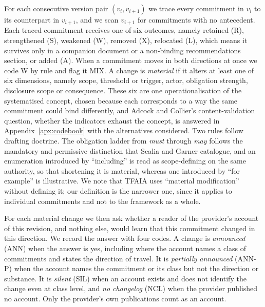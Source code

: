 \documentclass{article}
\begin{document}
For each consecutive version pair $(v_i, v_{i+1})$ we trace every commitment in $v_i$ to its counterpart in $v_{i+1}$, and we scan $v_{i+1}$ for commitments with no antecedent. Each traced commitment receives one of six outcomes, namely retained (R), strengthened (S), weakened (W), removed (X), relocated (L), which means it survives only in a companion document or a non-binding recommendations section, or added (A). When a commitment moves in both directions at once we code W by rule and flag it MIX. A change is \emph{material} if it alters at least one of six dimensions, namely scope, threshold or trigger, actor, obligation strength, disclosure scope or consequence. These six are one operationalisation of the systematised concept, chosen because each corresponds to a way the same commitment could bind differently, and Adcock and Collier's content-validation question, whether the indicators exhaust the concept, is answered in Appendix~\ref{apx:codebook} with the alternatives considered. Two rules follow drafting doctrine. The obligation ladder from \emph{must} through \emph{may} follows the mandatory and permissive distinction that Scalia and Garner \citep{scalia2012reading} catalogue, and an enumeration introduced by ``including'' is read as scope-defining on the same authority, so that shortening it is material, whereas one introduced by ``for example'' is illustrative. We note that TFAIA uses ``material modification'' without defining it; our definition is the narrower one, since it applies to individual commitments and not to the framework as a whole.

For each material change we then ask whether a reader of the provider's account of this revision, and nothing else, would learn that this commitment changed in this direction. We record the answer with four codes. A change is \emph{announced} (ANN) when the answer is yes, including where the account names a class of commitments and states the direction of travel. It is \emph{partially announced} (ANN-P) when the account names the commitment or its class but not the direction or substance. It is \emph{silent} (SIL) when an account exists and does not identify the change even at class level, and \emph{no changelog} (NCL) when the provider published no account. Only the provider's own publications count as an account.
\end{document}
